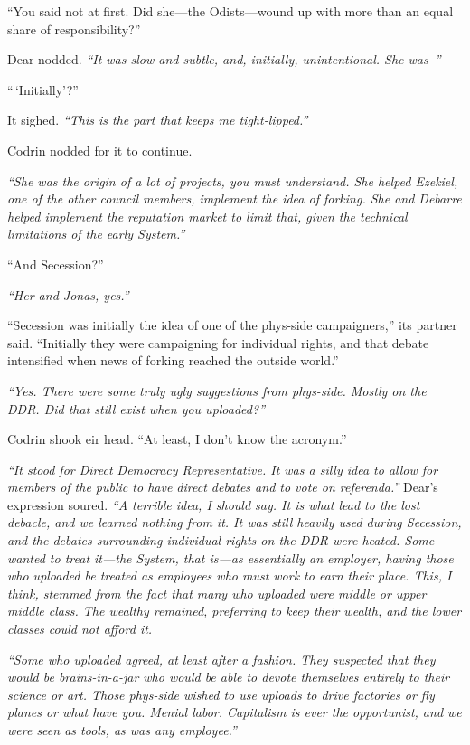 ``You said not at first. Did she---the Odists---wound up with more than an equal share of responsibility?''

Dear nodded. \emph{``It was slow and subtle, and, initially, unintentional. She was--''}

``\,`Initially'?''

It sighed. \emph{``This is the part that keeps me tight-lipped.''}

Codrin nodded for it to continue.

\emph{``She was the origin of a lot of projects, you must understand. She helped Ezekiel, one of the other council members, implement the idea of forking. She and Debarre helped implement the reputation market to limit that, given the technical limitations of the early System.''}

``And Secession?''

\emph{``Her and Jonas, yes.''}

``Secession was initially the idea of one of the phys-side campaigners,'' its partner said. ``Initially they were campaigning for individual rights, and that debate intensified when news of forking reached the outside world.''

\emph{``Yes. There were some truly ugly suggestions from phys-side. Mostly on the DDR. Did that still exist when you uploaded?''}

Codrin shook eir head. ``At least, I don't know the acronym.''

\emph{``It stood for Direct Democracy Representative. It was a silly idea to allow for members of the public to have direct debates and to vote on referenda.''} Dear's expression soured. \emph{``A terrible idea, I should say. It is what lead to the lost debacle, and we learned nothing from it. It was still heavily used during Secession, and the debates surrounding individual rights on the DDR were heated. Some wanted to treat it---the System, that is---as essentially an employer, having those who uploaded be treated as employees who must work to earn their place. This, I think, stemmed from the fact that many who uploaded were middle or upper middle class. The wealthy remained, preferring to keep their wealth, and the lower classes could not afford it.}

\emph{``Some who uploaded agreed, at least after a fashion. They suspected that they would be brains-in-a-jar who would be able to devote themselves entirely to their science or art. Those phys-side wished to use uploads to drive factories or fly planes or what have you. Menial labor. Capitalism is ever the opportunist, and we were seen as tools, as was any employee.''}

